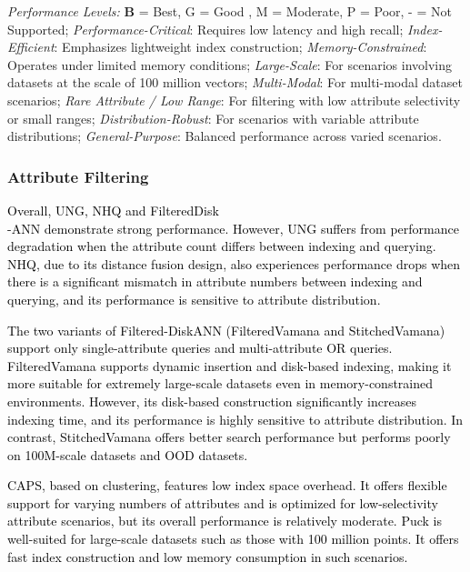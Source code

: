 \documentclass[sigconf, nonacm, pdfa]{acmart}
\begin{document}
{\begin{table}[htbp]
{\begin{minipage}{\linewidth}
		\textit{Performance Levels:} \textbf{B} = Best, G = Good , M = Moderate, P = Poor, - = Not Supported;
		\textit{Performance-Critical}: Requires low latency and high recall;
		\textit{Index-Efficient}: Emphasizes lightweight index construction;
		\textit{Memory-Constrained}: Operates under limited memory conditions;
		\textit{Large-Scale}: For scenarios involving datasets at the scale of 100 million vectors;
		\textit{Multi-Modal}: For multi-modal dataset scenarios;
		\textit{Rare Attribute / Low Range}: For filtering with low attribute selectivity or small ranges;
		\textit{Distribution-Robust}: For scenarios with variable attribute distributions;
		\textit{General-Purpose}: Balanced performance across varied scenarios.
	
\end{minipage}}

\end{table}

	
	\subsubsection{Attribute Filtering}


\textcolor{black}{
Overall, UNG, NHQ and FilteredDisk\\-ANN demonstrate strong performance. However, UNG suffers from performance degradation when the attribute count differs between indexing and querying. NHQ, due to its distance fusion design, also experiences performance drops when there is a significant mismatch in attribute numbers between indexing and querying, and its performance is sensitive to attribute distribution. }

\textcolor{black}{The two variants of Filtered-DiskANN (FilteredVamana and StitchedVamana) support only single-attribute queries and multi-attribute OR queries. FilteredVamana supports dynamic insertion and disk-based indexing, making it more suitable for extremely large-scale datasets even in memory-constrained environments. However, its disk-based construction significantly increases indexing time, and its performance is highly sensitive to attribute distribution. In contrast, StitchedVamana offers better search performance but performs poorly on 100M-scale datasets and OOD datasets.}

\textcolor{black}{
CAPS, based on clustering, features low index space overhead. It offers flexible support for varying numbers of attributes and is optimized for low-selectivity attribute scenarios, but its overall performance is relatively moderate.
Puck is well-suited for large-scale datasets such as those with 100 million points. It offers fast index construction and low memory consumption in such scenarios. 
}


}
\end{document}
